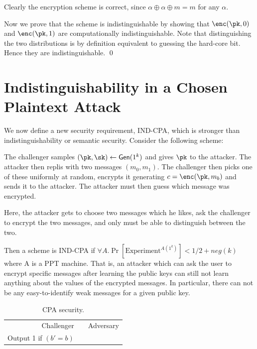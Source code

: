 \documentclass[12pt]{tufte-book}
\begin{document}
\proof
Clearly the encryption scheme is correct, since $\alpha \oplus \alpha \oplus m = m$ for any $\alpha$.

Now we  prove  that the scheme is indistinguishable by showing that $\enc(\pk, 0)$ and $\enc(\pk, 1)$
are computationally indistinguishable. Note that distinguishing the two distributions is by definition equivalent to guessing the hard-core bit.
Hence they are indistinguishable.
\qed



\section{Indistinguishability in a Chosen Plaintext Attack}

We now define a new security requirement, IND-CPA, which is stronger than indistinguishability
or semantic security. Consider the following scheme:

The challenger samples $(\pk, \sk) \gets \gen(1^k)$  and gives $\pk$ to the attacker.
The attacker then replis with two messages $(m_0, m_1)$. The challenger then picks
one of these uniformly at random, encrypts it generating $c = \enc(\pk, m_b)$ and sends
it to the attacker. The attacker must then guess which message was encrypted.

Here, the attacker gets to choose two messages which he likes, ask the challenger to
encrypt the two messages, and only must be able to distinguish between the two.

Then a scheme is IND-CPA if $\forall A . \Pr[\text{Experiment}^{A(1^k)}] < 1/2+neg(k)$ where
A is a PPT machine. That is,
an attacker which can ask the user to encrypt specific messages after learning the
public keys can still not learn anything about the values of the encrypted messages. In
particular, there can not be any easy-to-identify weak messages for a given public key.

\begin{table}[ht]
\centering
\begin{tabular}{r c l}
Challenger & & Adversary \\
Output 1 if $(b'=b)$ & & \\
\end{tabular}
\caption{CPA security.}\label{tab:cpa}
\end{table}
\end{document}
